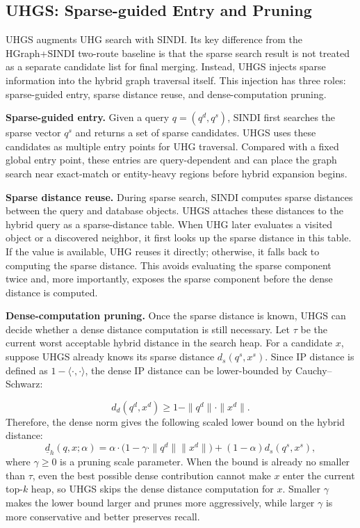 \subsection{UHGS: Sparse-guided Entry and Pruning}

UHGS augments UHG search with SINDI. Its key difference from the HGraph+SINDI two-route baseline is that the sparse search result is not treated as a separate candidate list for final merging. Instead, UHGS injects sparse information into the hybrid graph traversal itself. This injection has three roles: sparse-guided entry, sparse distance reuse, and dense-computation pruning.

\textbf{Sparse-guided entry.} Given a query $q=(q^d,q^s)$, SINDI first searches the sparse vector $q^s$ and returns a set of sparse candidates. UHGS uses these candidates as multiple entry points for UHG traversal. Compared with a fixed global entry point, these entries are query-dependent and can place the graph search near exact-match or entity-heavy regions before hybrid expansion begins.

\textbf{Sparse distance reuse.} During sparse search, SINDI computes sparse distances between the query and database objects. UHGS attaches these distances to the hybrid query as a sparse-distance table. When UHG later evaluates a visited object or a discovered neighbor, it first looks up the sparse distance in this table. If the value is available, UHG reuses it directly; otherwise, it falls back to computing the sparse distance. This avoids evaluating the sparse component twice and, more importantly, exposes the sparse component before the dense distance is computed.

\textbf{Dense-computation pruning.} Once the sparse distance is known, UHGS can decide whether a dense distance computation is still necessary. Let $\tau$ be the current worst acceptable hybrid distance in the search heap. For a candidate $x$, suppose UHGS already knows its sparse distance $d_s(q^s,x^s)$. Since IP distance is defined as $1-\langle\cdot,\cdot\rangle$, the dense IP distance can be lower-bounded by Cauchy--Schwarz:

\begin{equation}
    d_d(q^d,x^d) \geq 1-\|q^d\|\cdot\|x^d\|.
\end{equation}
Therefore, the dense norm gives the following scaled lower bound on the hybrid distance:
\begin{equation}
    \underline{d}_h(q,x;\alpha)
    = \alpha\cdot\big(1-\gamma\cdot\|q^d\|\|x^d\|\big)
    +(1-\alpha)d_s(q^s,x^s),
    \label{eq:uhgs-prune-bound}
\end{equation}
where $\gamma\geq0$ is a pruning scale parameter. When the bound is already no smaller than $\tau$, even the best possible dense contribution cannot make $x$ enter the current top-$k$ heap, so UHGS skips the dense distance computation for $x$. Smaller $\gamma$ makes the lower bound larger and prunes more aggressively, while larger $\gamma$ is more conservative and better preserves recall.

